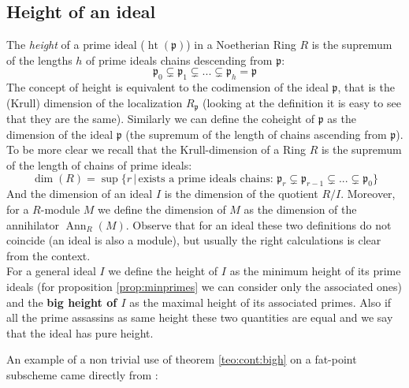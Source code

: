\documentclass[a4wide]{book}
\theoremstyle{plain}
\theoremstyle{remark}
\theoremstyle{definition}
\newcommand{\p}{\mathfrak{p}}
\DeclareMathOperator{\Ann}{Ann}
\DeclareMathOperator{\hgt}{ht}
\newcounter{que}
\begin{document}
	\subsection{Height of an ideal}
	The \textit{height} of a prime ideal ($\hgt ( \p )$) in a Noetherian Ring $ R $ is the supremum of the lengths $ h $ of prime ideals chains descending from $ \p $:
	\begin{equation}\label{eq:chain}
		\p_0 \subsetneq \p_1 \subsetneq ... \subsetneq \p_{h} = \p
	\end{equation}
	The concept of height is equivalent to the codimension of the ideal $ \p $, that is the (Krull) dimension of the localization $ R_\p $ (looking at the definition it is easy to see that they are the same). Similarly we can define the coheight of $ \p $ as the dimension of the ideal $ \p $ (the supremum of the length of chains ascending from $ \p $). To be more clear we recall that the Krull-dimension of a Ring $ R $ is the supremum of the length of chains of prime ideals:
	\[ \dim (R) = \sup \{ r \,|\, \text{exists a prime ideals chains: } \p_r \subsetneq \p_{r-1} \subsetneq ... \subsetneq \p_0 \}\] 
	And the dimension of an ideal $ I $ is the dimension of the quotient $ R/I $. Moreover, for a $ R $-module $ M $ we define the dimension of $ M $ as the dimension of the annihilator $ \Ann_R(M) $. Observe that for an ideal these two definitions do not coincide (an ideal is also a module), but usually the right calculations is clear from the context. \\
	For a general ideal $ I $ we define the height of $ I $ as the minimum height of its prime ideals (for proposition \ref{prop:minprimes} we can consider only the associated ones) and the \textbf{big height of $ I $} as the maximal height of its associated primes. Also if all the prime assassins as same height these two quantities are equal and we say that the ideal has pure height.


%
%
	
	An example of a non trivial use of theorem \ref{teo:cont:bigh} on a fat-point subscheme came directly from \cite[2.3]{EinLazSmi01}:
	
\end{document}
